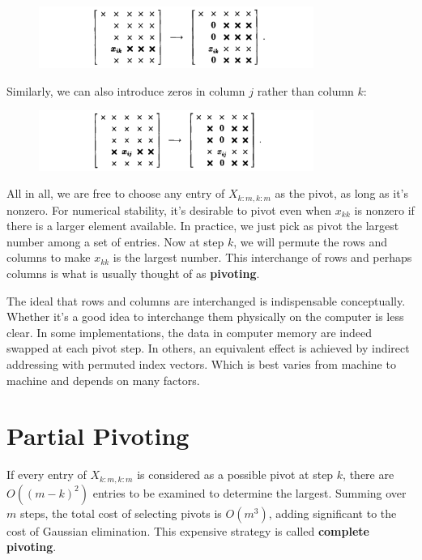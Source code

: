 \begin{figure}[H]
    \centering
    \includegraphics[width=0.8\textwidth]{figures/21-2.png}
\end{figure}
Similarly, we can also introduce zeros in column $j$ rather than column $k$:
\begin{figure}[H]
    \centering
    \includegraphics[width=0.8\textwidth]{figures/21-3.png}
\end{figure}
All in all, we are free to choose any entry of $X_{k:m, k:m}$ as the pivot, as long as it's nonzero. For numerical stability, it's desirable to pivot even when $x_{kk}$ is nonzero if there is a larger element available. In practice, we just pick as pivot the largest number among a set of entries. Now at step $k$, we will permute the rows and columns to make $x_{kk}$ is the largest number. This interchange of rows and perhaps columns is what is usually thought of as \textbf{pivoting}.  


\begin{note}
The ideal that rows and columns are interchanged is indispensable conceptually. Whether it's a good idea to interchange them physically on the computer is less clear. In some implementations, the data in computer memory are indeed swapped at each pivot step. In others, an equivalent effect is achieved by indirect addressing with permuted index vectors. Which is best varies from machine to machine and depends on many factors. 
\end{note}

\section{Partial Pivoting}
If every entry of $X_{k:m, k:m}$ is considered as a possible pivot at step $k$, there are $O((m-k)^2)$ entries to be examined to determine the largest. Summing over $m$ steps, the total cost of selecting pivots is $O(m^3)$, adding significant to the cost of Gaussian elimination. This expensive strategy is called \textbf{complete pivoting}. 

